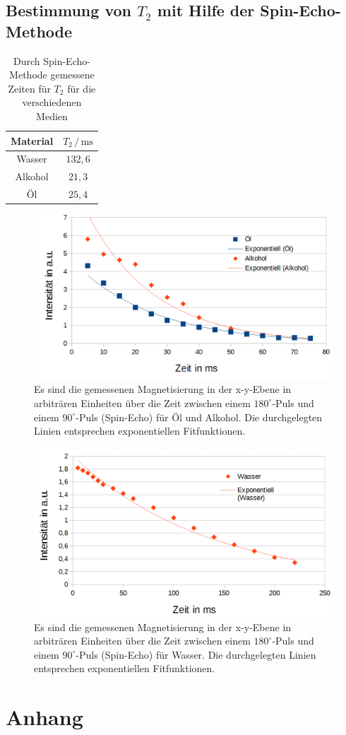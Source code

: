 \documentclass[numbers=noenddot,a4paper,notitlepage,twoside,BCOR15mm]{scrartcl}
\begin{document}
	\subsection{Bestimmung von $T_2$ mit Hilfe der Spin-Echo-Methode}
	
	\begin{table}[h]
		\centering
		\caption{Durch Spin-Echo-Methode gemessene Zeiten für $T_2$ für die verschiedenen Medien}
		\begin{tabular}{c c}
			Material & $T_2\,/\,\mathrm{ms}$  \\ \hline
			Wasser 	& $132,6$  \\
			Alkohol & $21,3$  \\
			Öl 		& $25,4$ 
		\end{tabular}
		\label{tab:1T2}
	\end{table}
	\begin{figure}[h]
		\centering
		\includegraphics[width=1\textwidth]{pics/T2_1}
			\caption{Es sind die gemessenen Magnetisierung in der x-y-Ebene in arbiträren Einheiten über die Zeit zwischen einem $180^\circ$-Puls und einem $90^\circ$-Puls (Spin-Echo) für Öl und Alkohol. Die durchgelegten Linien entsprechen exponentiellen Fitfunktionen.}
			\label{abb:T2_1}
	\end{figure}
	\begin{figure}[h]
	\centering
	\includegraphics[width=1\textwidth]{pics/T2_2}
			\caption{Es sind die gemessenen Magnetisierung in der x-y-Ebene in arbiträren Einheiten über die Zeit zwischen einem $180^\circ$-Puls und einem $90^\circ$-Puls (Spin-Echo) für Wasser. Die durchgelegten Linien entsprechen exponentiellen Fitfunktionen.}
	\label{abb:T2_2}
	\end{figure}

	\section{Anhang}
	
		
		
\end{document}
